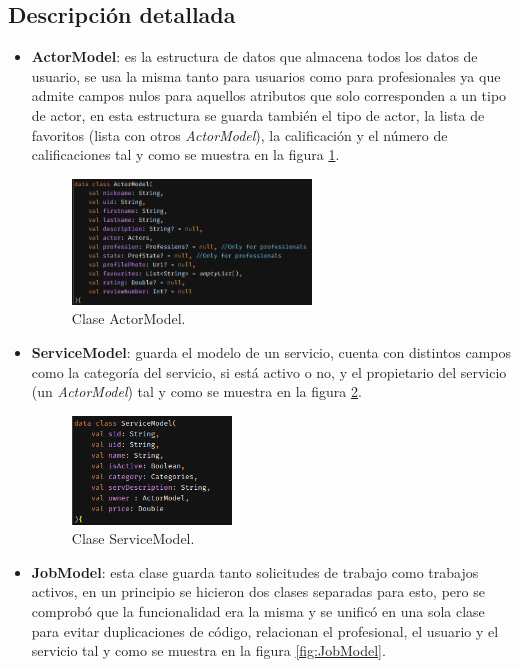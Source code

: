 \subsection{Descripción detallada}
\begin{itemize}
    \item \textbf{ActorModel}: es la estructura de datos que almacena todos los datos de usuario, se usa la misma tanto para usuarios como para profesionales ya que admite campos nulos para aquellos atributos que solo corresponden a un tipo de actor, en esta estructura se guarda también el tipo de actor, la lista de favoritos (lista con otros \textit{ActorModel}), la calificación y el número de calificaciones tal y como se muestra en la figura \ref{fig:actorModel}.
    \begin{figure}[h]
        \centering
        \includegraphics[width = 0.6\textwidth]{Imagenes/Fuentes/actorModel.png}
        \caption{Clase ActorModel.}
        \label{fig:actorModel}
    \end{figure}
    \item \textbf{ServiceModel}: guarda el modelo de un servicio, cuenta con distintos campos como la categoría del servicio, si está activo o no, y el propietario del servicio (un \textit{ActorModel}) tal y como se muestra en la figura \ref{fig:ServiceModel}.
    \begin{figure}[h]
        \centering
        \includegraphics[width = 0.4\textwidth]{Imagenes/Fuentes/ServiceModel.png}
        \caption{Clase ServiceModel.}
        \label{fig:ServiceModel}
    \end{figure}
    \item \textbf{JobModel}: esta clase guarda tanto solicitudes de trabajo como trabajos activos, en un principio se hicieron dos clases separadas para esto, pero se comprobó que la funcionalidad era la misma y se unificó en una sola clase para evitar duplicaciones de código, relacionan el profesional, el usuario y el servicio tal y como se muestra en la figura \ref{fig:JobModel}.

\end{itemize}
